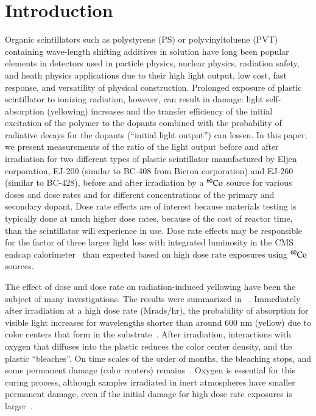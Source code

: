 \documentclass[review]{elsarticle}
\begin{document}
\section{Introduction}
Organic scintillators such as polystyrene (PS) or polyvinyltoluene (PVT)
containing wave-length shifting
additives in solution have long been popular elements in detectors used
in particle physics, nuclear physics, radiation safety, and heath physics applications  due to their high light output, low cost, fast response,
and versatility of physical construction. 
Prolonged exposure of plastic scintillator to
ionizing radiation, however, can result in damage:
light self-absorption (yellowing) increases and
the transfer efficiency of the initial excitation of the polymer to the
dopants combined with the probability of radiative decays for the dopants (``initial light output'') can lessen.  
In this paper, we present measurements of the ratio of the light output before and after irradiation
for two different types of plastic scintillator manufactured by Eljen corporation, EJ-200 (similar to BC-408 from Bicron corporation) and EJ-260 (similar to BC-428), before and after irradiation by a $\rm {^{60}Co}$ source for various doses and dose rates and for different concentrations of the primary and secondary dopant.
Dose rate effects are of interest because materials testing is typically done at much higher dose rates, because of the cost of reactor time, than the scintillator will experience in use.  Dose rate effects may be responsible for the
factor of three larger light loss with integrated luminosity 
in the CMS endcap calorimeter~\cite{phaseiitdr,ecfa2015}
than expected based
on high dose rate exposures using ${\rm ^{60}Co}$ sources.

The effect of dose and dose rate on radiation-induced yellowing have been the subject of many investigations. The results were summarized in ~\cite{sauli}.  
Immediately after irradiation at a high dose rate (Mrads/hr), 
the probability of absorption for visible light increases for wavelengths shorter than around 600 nm (yellow) due to color centers that form in the substrate~\cite{Bross199135}.  
After irradiation, interactions with oxygen that diffuses into the plastic reduces the color center density, and the plastic ``bleaches''.  On time scales of the order of months, the bleaching stops, and some permanent damage (color centers) remains~\cite{sauli}.
Oxygen is essential for this curing process, although samples irradiated in inert atmospheres have smaller permanent damage, even if the initial damage for high dose rate exposures is larger~\cite{zorn2}.  
\end{document}
